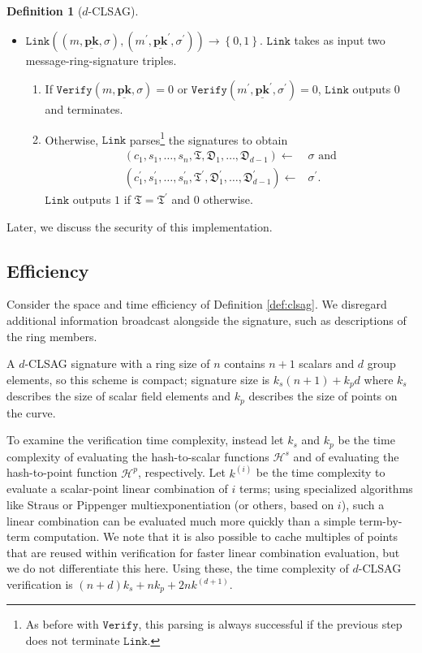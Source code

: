 \documentclass{mrl}
\theoremstyle{plain}
\theoremstyle{definition}
\newtheorem{definition}{Definition}[section]
\begin{document}
\begin{definition}[$d$-CLSAG]
\begin{itemize}
\item $\texttt{Link}\left((m, \underline{\textbf{pk}}, \sigma), (m^\prime, \underline{\textbf{pk}}^\prime, \sigma^\prime)\right) \to \left\{0,1\right\}$. $\texttt{Link}$ takes as input two message-ring-signature triples.
\begin{enumerate}
\item If $\texttt{Verify}(m, \underline{\textbf{pk}}, \sigma) = 0$ or $\texttt{Verify}(m^\prime, \underline{\textbf{pk}}^\prime, \sigma^\prime) = 0$, $\texttt{Link}$ outputs $0$ and terminates.

\item Otherwise, $\texttt{Link}$ parses\footnote{As before with $\texttt{Verify}$, this parsing is always successful if the previous step does not terminate $\texttt{Link}$.} the signatures to obtain
\begin{align*}
(c_1, s_1, \ldots, s_n, \mathfrak{T}, \mathfrak{D}_1, \ldots, \mathfrak{D}_{d-1}) \leftarrow&  \sigma\text{ and}\\
(c_1^\prime, s_1^\prime, \ldots, s_n^\prime, \mathfrak{T}^\prime, \mathfrak{D}_1^\prime, \ldots, \mathfrak{D}_{d-1}^\prime) \leftarrow& \sigma^\prime.
\end{align*} $\texttt{Link}$ outputs $1$ if $\mathfrak{T} = \mathfrak{T}^\prime$ and $0$ otherwise.
\end{enumerate}
\end{itemize}
\end{definition}

Later, we discuss the security of this implementation. 


\subsection{Efficiency}
Consider the space and time efficiency of Definition \ref{def:clsag}. We disregard additional information broadcast alongside the signature, such as descriptions of the ring members. 

A $d$-CLSAG signature with a ring size of $n$ contains $n+1$ scalars and $d$ group elements, so this scheme is compact; signature size is $k_s(n+1) + k_p d$ where $k_s$ describes the size of scalar field elements and $k_p$ describes the size of points on the curve.

To examine the verification time complexity, instead let $k_s$ and $k_p$ be the time complexity of evaluating the hash-to-scalar functions $\mathcal{H}^s$ and of evaluating the hash-to-point function $\mathcal{H}^p$, respectively. Let $k^{(i)}$ be the time complexity to evaluate a scalar-point linear combination of $i$ terms; using specialized algorithms like Straus \cite{straus} or Pippenger \cite{pippenger} multiexponentiation (or others, based on $i$), such a linear combination can be evaluated much more quickly than a simple term-by-term computation. We note that it is also possible to cache multiples of points that are reused within verification for faster linear combination evaluation, but we do not differentiate this here. Using these, the time complexity of $d$-CLSAG verification is $(n+d)k_s + nk_p + 2nk^{(d+1)}$.
\end{document}
